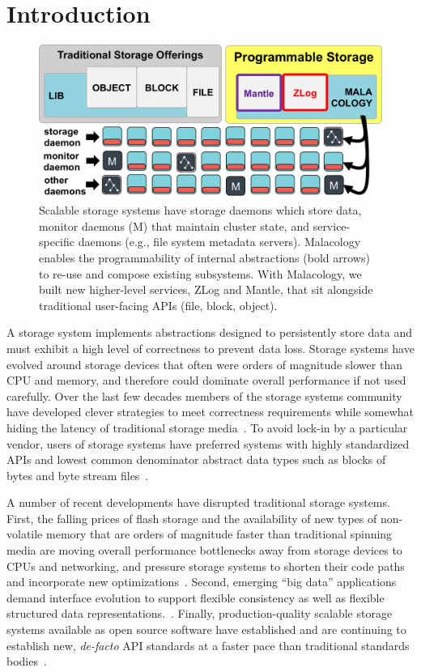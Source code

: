 \section{Introduction}
\label{introduction}
\label{sec:intro}

\begin{figure}[tb]
\centering
\includegraphics{figures/overview.png}
\caption{Scalable storage systems have storage daemons which store data,
monitor daemons (M) that maintain cluster state, and service-specific daemons
(e.g., file system metadata servers). Malacology enables the programmability of
internal abstractions (bold arrows) to re-use and compose existing subsystems.
With Malacology, we built new higher-level services, ZLog and Mantle, that sit
alongside traditional user-facing APIs (file, block,
object).}\label{fig:overview}
\end{figure}

A storage system implements abstractions designed to persistently store data
and must exhibit a high level of correctness to prevent data loss.  Storage
systems have evolved around storage devices that often were orders of magnitude
slower than CPU and memory, and therefore could dominate overall performance if
not used carefully. Over the last few decades members of the storage systems
community have developed clever strategies to meet correctness requirements
while somewhat hiding the latency of traditional storage
media~\cite{brewer_disks_2016}. To avoid lock-in by a particular vendor, users
of storage systems have preferred systems with highly standardized APIs and
lowest common denominator abstract data types such as blocks of bytes and byte
stream files~\cite{armbrust_view_2010}.

A number of recent developments have disrupted traditional storage systems.
First, the falling prices of flash storage and the availability of new types of
non-volatile memory that are orders of magnitude faster than traditional
spinning media are moving overall performance bottlenecks away from storage
devices to CPUs and networking, and pressure storage systems to shorten their
code paths and incorporate new
optimizations~\cite{gray_tape_2007,gray_flash_2008}.  Second, emerging ``big
data'' applications demand interface evolution to support flexible consistency
as well as flexible structured data
representations.~\cite{apache_contributors_parquet_2014}.  Finally,
production-quality scalable storage systems available as open source software
have established and are continuing to establish new, \emph{de-facto} API
standards at a faster pace than traditional standards
bodies~\cite{snia_implementing_2014,linux_foundation_kinetic_2015}.

